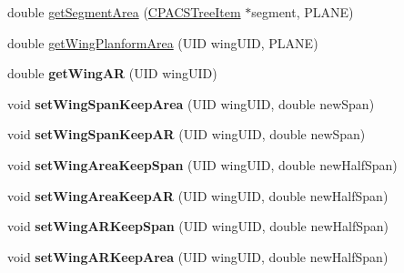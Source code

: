 \begin{DoxyCompactItemize}
\item 
double \hyperlink{classcpcr_1_1AircraftTree_a6f25690ca6eb74160232a7e1db3f8067}{get\-Segment\-Area} (\hyperlink{classcpcr_1_1CPACSTreeItem}{C\-P\-A\-C\-S\-Tree\-Item} $\ast$segment, P\-L\-A\-N\-E)
\item 
double \hyperlink{classcpcr_1_1AircraftTree_a1f3cb361f72ecc148f44fd6ec7694109}{get\-Wing\-Planform\-Area} (U\-I\-D wing\-U\-I\-D, P\-L\-A\-N\-E)
\item 
\hypertarget{classcpcr_1_1AircraftTree_aecaa232b5b267b646a1bc61a168c6f4e}{double {\bfseries get\-Wing\-A\-R} (U\-I\-D wing\-U\-I\-D)}\label{classcpcr_1_1AircraftTree_aecaa232b5b267b646a1bc61a168c6f4e}

\item 
\hypertarget{classcpcr_1_1AircraftTree_ad50a708bfed8e22c805af14bd3ffee82}{void {\bfseries set\-Wing\-Span\-Keep\-Area} (U\-I\-D wing\-U\-I\-D, double new\-Span)}\label{classcpcr_1_1AircraftTree_ad50a708bfed8e22c805af14bd3ffee82}

\item 
\hypertarget{classcpcr_1_1AircraftTree_a43b1473aa8b38a6eb98c979b6445d22a}{void {\bfseries set\-Wing\-Span\-Keep\-A\-R} (U\-I\-D wing\-U\-I\-D, double new\-Span)}\label{classcpcr_1_1AircraftTree_a43b1473aa8b38a6eb98c979b6445d22a}

\item 
\hypertarget{classcpcr_1_1AircraftTree_ac907eb6252b2250163a513c7e35677fd}{void {\bfseries set\-Wing\-Area\-Keep\-Span} (U\-I\-D wing\-U\-I\-D, double new\-Half\-Span)}\label{classcpcr_1_1AircraftTree_ac907eb6252b2250163a513c7e35677fd}

\item 
\hypertarget{classcpcr_1_1AircraftTree_a8e1070996780f6322020fcb5c09aebbb}{void {\bfseries set\-Wing\-Area\-Keep\-A\-R} (U\-I\-D wing\-U\-I\-D, double new\-Half\-Span)}\label{classcpcr_1_1AircraftTree_a8e1070996780f6322020fcb5c09aebbb}

\item 
\hypertarget{classcpcr_1_1AircraftTree_acfdbf4b8105878bdb3ef0373a1f2c30d}{void {\bfseries set\-Wing\-A\-R\-Keep\-Span} (U\-I\-D wing\-U\-I\-D, double new\-Half\-Span)}\label{classcpcr_1_1AircraftTree_acfdbf4b8105878bdb3ef0373a1f2c30d}

\item 
\hypertarget{classcpcr_1_1AircraftTree_ad24012e546c82a53c247b77986258012}{void {\bfseries set\-Wing\-A\-R\-Keep\-Area} (U\-I\-D wing\-U\-I\-D, double new\-Half\-Span)}\label{classcpcr_1_1AircraftTree_ad24012e546c82a53c247b77986258012}

\end{DoxyCompactItemize}

